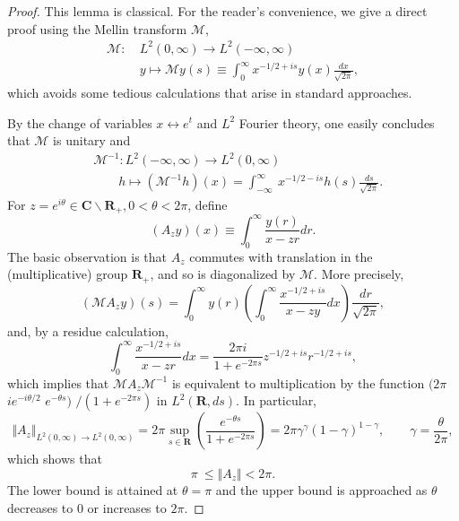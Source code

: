 \documentclass{surv-l}
\theoremstyle{plain}
\theoremstyle{definition}
\numberwithin{equation}{chapter}
\begin{document}
\begin{proof}
This lemma is classical. For the reader's convenience, we give a direct proof using the Mellin transform $\mathscr{M}$,
\renewcommand\theequation{23.7}
\setcounter{equation}{6}
\begin{align}\label{eq23.7}
\mathscr{M} :\ & L^{2}(0, \infty)\rightarrow L^{2}(-\infty,\infty)\\
& y\mapsto \mathscr{M}y(s)\equiv\int_{0}^{\infty}x^{-1/2+is}y(x)\frac{dx}{\sqrt{2\pi}},\nonumber
\end{align}
which avoids some tedious calculations that arise in standard approaches.

By the change of variables $x\leftrightarrow e^{t}$ and $L^{2}$ Fourier theory, one easily concludes that $\mathscr{M}$ is unitary and
\renewcommand\theequation{23.8}
\setcounter{equation}{7}
\begin{align}\label{eq23.8}
& \mathscr{M}^{-1}:L^{2}(-\infty, \infty)\rightarrow L^{2}(0, \infty)\\
& \qquad h\mapsto(\mathscr{M}^{-1}h)(x)=\int_{-\infty}^{\infty}\ x^{-1/2-is}h(s)\frac{ds}{\sqrt{2\pi}}.\nonumber
\end{align}
For $z=e^{i\theta}\in \textbf{C}\backslash \textbf{R}_{+}, 0<\theta<2\pi$, define
\renewcommand\theequation{23.9}
\setcounter{equation}{8}
\begin{equation}\label{eq23.9}
(A_{z}y)(x)\equiv\int_{0}^{\infty}\frac{y(r)}{x-zr}dr.
\end{equation}
The basic observation is that $A_{z}$ commutes with translation in the (multiplicative) group $\mathbf{R}_{+}$, and so is diagonalized by $\mathscr{M}$. More precisely,
\begin{equation*}
(\mathscr{M}A_{z}y)(s)=\int_{0}^{\infty}y(r)\left(\int_{0}^{\infty}\frac{x^{-1/2+is}}{x-zy}dx\right)\frac{dr}{\sqrt{2\pi}},
\end{equation*}
and, by a residue calculation,
\begin{equation*}
\int_{0}^{\infty}\frac{x^{-1/2+is}}{x-zr}dx=\frac{2\pi i}{1+e^{-2\pi s}}z^{-1/2+is}r^{-1/2+is},
\end{equation*}
which implies that $\mathscr{M}A_{z}\mathscr{M}^{-1}$ is equivalent to multiplication by the function $(2\pi$ $ie^{-i\theta/2}$ $e^{-\theta s})$ $/(1+e^{-2\pi s})$ in $L^{2} (\textbf{R}, ds)$. In particular,
\renewcommand\theequation{23.10}
\setcounter{equation}{9}
\begin{equation}\label{eq23.10}
\Vert A_{z}\Vert_{L^{2}(0,\infty)\rightarrow L^{2}(0,\infty)}=2\pi\sup_{s\in \mathbf{R}}\left(\frac{e^{-\theta
s}}{1+e^{-2\pi s}}\right)=2\pi\gamma^{\gamma}(1-\gamma)^{1-\gamma},\qquad \gamma=\frac{\theta}{2\pi},
\end{equation}
which shows that
\renewcommand\theequation{23.11}
\setcounter{equation}{10}
\begin{equation}\label{eq23.11}
\pi\ \leq\Vert A_{z}\Vert<2\pi.
\end{equation}
The lower bound is attained at $\theta=\pi$ and the upper bound is approached as $\theta$ decreases to $0$ or increases to $ 2\pi$.


\end{proof}
\end{document}
